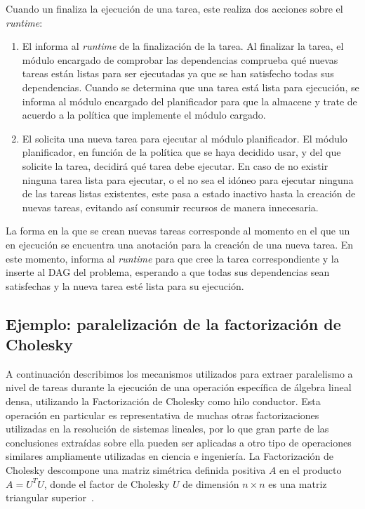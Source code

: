 Cuando un \wt finaliza la ejecución de una tarea, este realiza dos acciones
sobre el \emph{runtime}:
\begin{enumerate}
\item El \wt informa al \emph{runtime} de la finalización de la tarea. Al
  finalizar la tarea, el módulo encargado de comprobar las dependencias
  comprueba qué nuevas tareas están listas para ser ejecutadas ya que se
  han satisfecho todas sus dependencias. Cuando se determina que una tarea
  está lista para ejecución, se informa al módulo encargado del
  planificador para que la almacene y trate de acuerdo a la política que
  implemente el módulo cargado.
\item El \wt solicita una nueva tarea para ejecutar al módulo
  planificador. El módulo planificador, en función de la política que se
  haya decidido usar, y del \wt que solicite la tarea, decidirá qué tarea
  debe ejecutar. En caso de no existir ninguna tarea lista para ejecutar, o
  el \wt no sea el idóneo para ejecutar ninguna de las tareas listas
  existentes, este pasa a estado inactivo hasta la creación de nuevas
  tareas, evitando así consumir recursos de manera innecesaria.
\end{enumerate}

La forma en la que se crean nuevas tareas corresponde al momento en el que
un \wt en ejecución se encuentra una anotación para la creación de una
nueva tarea. En este momento, \wt informa al \emph{runtime} para que cree
la tarea correspondiente y la inserte al DAG del problema, esperando a que
todas sus dependencias sean satisfechas y la nueva tarea esté lista para su
ejecución.



\subsection{Ejemplo: paralelización de la factorización de Cholesky}

A continuación describimos los mecanismos utilizados para extraer paralelismo a nivel de tareas
durante la ejecución de una operación específica de álgebra lineal densa, utilizando la Factorización
de Cholesky como hilo conductor. Esta operación en particular es representativa de muchas
otras factorizaciones utilizadas en la resolución de sistemas lineales, por lo que gran parte de las
conclusiones extraídas sobre ella pueden ser aplicadas a otro tipo de operaciones similares ampliamente
utilizadas en ciencia e ingeniería.
%
La Factorización de Cholesky descompone una matriz simétrica definida positiva
$A$ en el producto $A=U^TU$, donde el factor de Cholesky $U$ de dimensión $n \times n$ es una matriz triangular
superior~\cite{GVL3}. 

